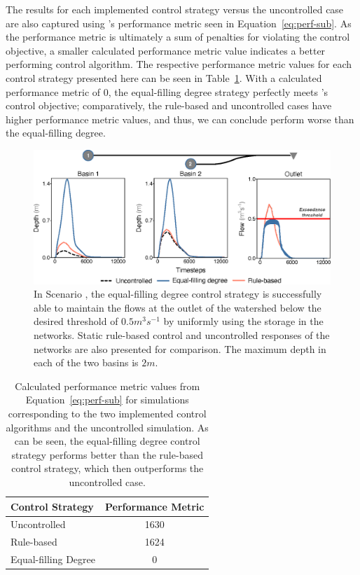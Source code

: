 The results for each implemented control strategy versus the uncontrolled case are also captured using 's performance metric seen in Equation~\ref{eq:perf-sub}. As the performance metric is ultimately a sum of penalties for violating the control objective, a smaller calculated performance metric value indicates a better performing control algorithm. The respective performance metric values for each control strategy presented here can be seen in Table~\ref{tab:perfmet}. With a calculated performance metric of $0$, the equal-filling degree strategy perfectly meets 's control objective; 
comparatively, the rule-based and uncontrolled cases have higher performance metric values, and thus, we can conclude perform worse than the equal-filling degree.
%
%
%
\begin{figure}
    \centering
    \includegraphics[width=\linewidth]{gfx/Chapter-5/equalfilling.eps}
    \caption{In Scenario , the equal-filling degree control strategy is successfully able to maintain the flows at the outlet of the watershed below the desired threshold of $0.5 \unit{m^3s^{-1}}$ by uniformly using the storage in the networks. Static rule-based control and uncontrolled responses of the networks are also presented for comparison. The maximum depth in each of the two basins is $2 \unit{m}$.}
    \label{fig:results}
\end{figure}
%
%
%
\begin{table}[ht]
\small
\caption{Calculated performance metric values from Equation~\ref{eq:perf-sub} for  simulations corresponding to the two implemented control algorithms and the uncontrolled simulation. As can be seen, the equal-filling degree control strategy performs better than the rule-based control strategy, which then outperforms the uncontrolled case.}\label{tab:perfmet}
\begin{tabular}{l c}
\toprule
{\centering \textbf{Control Strategy}} & \textbf{Performance Metric} \\\midrule
Uncontrolled & 1630 \\
Rule-based & 1624 \\
Equal-filling Degree & 0 \\
\bottomrule
\end{tabular}
\end{table}
%
%
%
%
%
%
%
%
%
%
%
%
%
%
%
